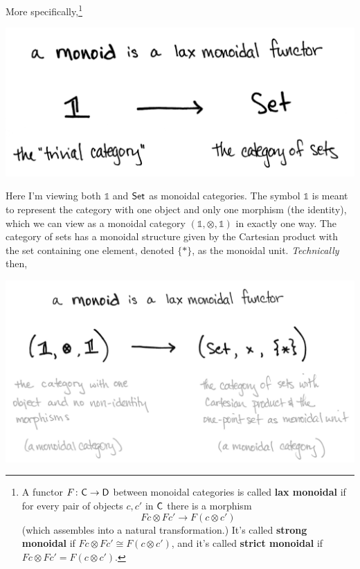 \documentclass{tufte-handout-tai}
\newcounter{dummy} %
\newcommand{\cat}[1]{{\normalfont\textsf{#1}}}
\theoremstyle{plain}
\theoremstyle{definition}
\theoremstyle{remark}
\begin{document}
\noindent More specifically,\footnote[][1cm]{\label{fn:Fc} A functor $F\colon \cat{C}\to\cat{D}$ between monoidal categories is called \textbf{lax monoidal} if for every pair of objects $c,c'$ in $\cat{C}$ there is a morphism \[Fc\otimes Fc'\to F(c\otimes c')\] (which assembles into a natural transformation.) It's called \textbf{strong monoidal} if $Fc\otimes Fc'\cong F(c\otimes c')$, and it's called \textbf{strict monoidal} if $Fc\otimes Fc' = F(c\otimes c')$.}
\begin{center}
\label{fig:monfun1}
\includegraphics[width=!,totalheight=!,scale=0.1]{wmonfun1.png}
\end{center}
Here I'm viewing both $\mathbb{1}$ and $\cat{Set}$ as monoidal categories. The symbol $\mathbb{1}$ is meant to represent the category with one object and only one morphism (the identity), which we can view as a monoidal category $(\mathbb{1},\otimes,\mathbb{1})$ in exactly one way. The category of sets has a monoidal structure given by the Cartesian product with the set containing one element, denoted $\{\ast\}$, as the monoidal unit. \textit{Technically} then,
\begin{center}
\includegraphics[width=!,totalheight=!,scale=0.1]{monfun.jpg}
\end{center}
\end{document}
